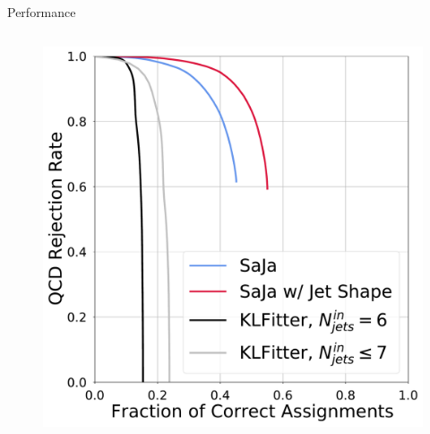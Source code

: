 \begin{frame}[fragile]{Performance}
\begin{columns}
\begin{figure}
        \includegraphics[width=\textwidth]{fig/roc/roc_qcd_rej_vs_correct.pdf}
      \end{figure}
  \end{columns}
\end{frame}

